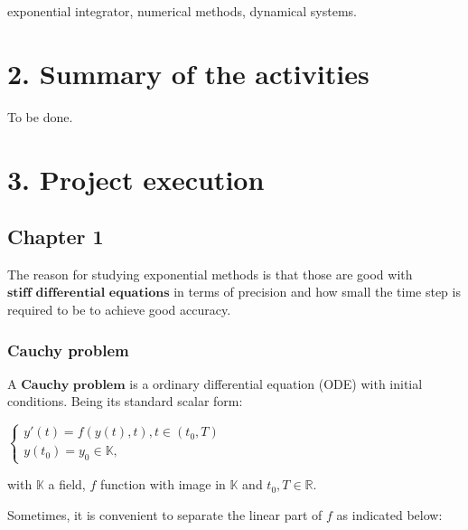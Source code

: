 \documentclass[letterpaper,10pt,english]{jupyterBook}
\begin{document}
\sphinxAtStartPar
{} exponential integrator, numerical methods, dynamical systems.

\sphinxstepscope


\chapter{2. Summary of the activities}
\label{\detokenize{Summary_of_the_activities:summary-of-the-activities}}\label{\detokenize{Summary_of_the_activities::doc}}
\sphinxAtStartPar
To be done.

\sphinxstepscope


\chapter{3. Project execution}
\label{\detokenize{Project_execution:project-execution}}\label{\detokenize{Project_execution::doc}}
\sphinxstepscope

\sphinxstepscope


\section{Chapter 1}
\label{\detokenize{cap1:chapter-1}}\label{\detokenize{cap1::doc}}
\sphinxAtStartPar
The reason for studying exponential methods is that those are good with \(\textbf{stiff differential equations}\) in terms of precision and how small the time step is required to be to achieve good accuracy.


\subsection{Cauchy problem}
\label{\detokenize{cap1:cauchy-problem}}
\sphinxAtStartPar
A \(\textbf{Cauchy problem}\) is a ordinary differential equation (ODE) with initial conditions. Being its standard scalar form:

\sphinxAtStartPar
\(\begin{cases}
    y'(t) = f(y(t), t), t \in (t_0, T) \\
    y(t_0) = y_0 \in \mathbb{K} \text{,}
\end{cases}\)

\sphinxAtStartPar
with \(\mathbb{K}\) a field, \(f\) function with image in \(\mathbb{K}\) and \(t_0, T \in \mathbb{R}\).

\sphinxAtStartPar
Sometimes, it is convenient to separate the linear part of \(f\) as indicated below:
\end{document}
